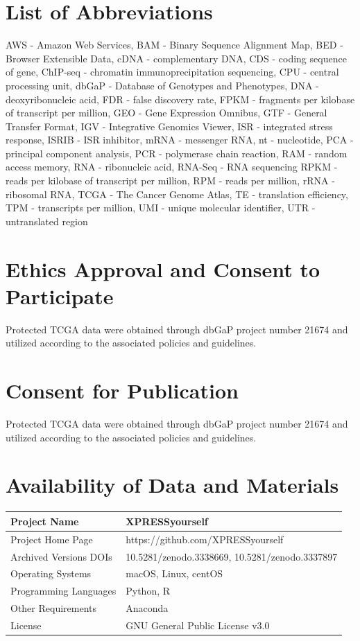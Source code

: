 \documentclass[10pt, oneside]{article}
\begin{document}
\section*{List of Abbreviations}
AWS - Amazon Web Services,
BAM - Binary Sequence Alignment Map,
BED - Browser Extensible Data,
cDNA - complementary DNA,
CDS - coding sequence of gene,
ChIP-seq - chromatin immunoprecipitation sequencing,
CPU - central processing unit,
dbGaP - Database of Genotypes and Phenotypes,
DNA - deoxyribonucleic acid,
FDR - false discovery rate,
FPKM - fragments per kilobase of transcript per million,
GEO - Gene Expression Omnibus,
GTF - General Transfer Format,
IGV - Integrative Genomics Viewer,
ISR - integrated stress response,
ISRIB - ISR inhibitor,
mRNA - messenger RNA,
nt - nucleotide,
PCA - principal component analysis,
PCR - polymerase chain reaction,
RAM - random access memory,
RNA - ribonucleic acid,
RNA-Seq - RNA sequencing
RPKM - reads per kilobase of transcript per million,
RPM - reads per million,
rRNA - ribosomal RNA,
TCGA - The Cancer Genome Atlas,
TE - translation efficiency,
TPM - transcripts per million,
UMI - unique molecular identifier,
UTR - untranslated region

\section*{Ethics Approval and Consent to Participate}
Protected TCGA data were obtained through dbGaP project number 21674 and utilized according to the associated policies and guidelines.

\section*{Consent for Publication}
Protected TCGA data were obtained through dbGaP project number 21674 and utilized according to the associated policies and guidelines.

\section*{Availability of Data and Materials}
\begin{table}[!]
    \centering
{}
\begin{tabular}{p{4cm}p{9cm}}
 Project Name & XPRESSyourself \\
 \hline
 Project Home Page & https://github.com/XPRESSyourself \\
 \hline
 Archived Versions DOIs & 10.5281/zenodo.3338669, 10.5281/zenodo.3337897 \\
 \hline
 Operating Systems & macOS, Linux, centOS \\
 \hline
 Programming Languages & Python, R \\
 \hline
 Other Requirements & Anaconda \\
 \hline
 License & GNU General Public License v3.0 \\
\end{tabular}
\end{table}
\end{document}
